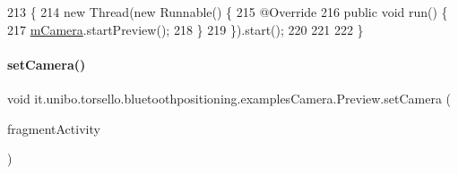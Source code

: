 \begin{DoxyCode}
213                               \{
214         \textcolor{keyword}{new} Thread(\textcolor{keyword}{new} Runnable() \{
215             @Override
216             \textcolor{keyword}{public} \textcolor{keywordtype}{void} run() \{
217                 \hyperlink{classit_1_1unibo_1_1torsello_1_1bluetoothpositioning_1_1examplesCamera_1_1Preview_a1690c2d132a340b5726ef9712e961dd9_a1690c2d132a340b5726ef9712e961dd9}{mCamera}.startPreview();
218             \}
219         \}).start();
220 
221 
222     \}
\end{DoxyCode}
\hypertarget{classit_1_1unibo_1_1torsello_1_1bluetoothpositioning_1_1examplesCamera_1_1Preview_a018960081707cd70025fb4b7e0322162_a018960081707cd70025fb4b7e0322162}{}\label{classit_1_1unibo_1_1torsello_1_1bluetoothpositioning_1_1examplesCamera_1_1Preview_a018960081707cd70025fb4b7e0322162_a018960081707cd70025fb4b7e0322162} 
\paragraph{\texorpdfstring{set\+Camera()}{setCamera()}}
{\footnotesize\ttfamily void it.\+unibo.\+torsello.\+bluetoothpositioning.\+examples\+Camera.\+Preview.\+set\+Camera (\begin{DoxyParamCaption}\item[{Fragment\+Activity}]{fragment\+Activity }\end{DoxyParamCaption})}


